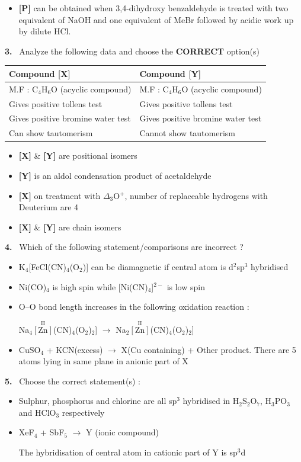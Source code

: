 \documentclass[10pt]{extarticle}
\newcommand{\qn}[1]{\par\smallskip\noindent\textbf{#1.}~}
\newenvironment{qoptions}{\begin{itemize}[leftmargin=1.8em,itemsep=1pt,topsep=2pt,label={}]}{\end{itemize}}
\newcommand{\opt}[2]{\item[(#1)] #2}
\begin{document}
\begin{multicols}{2}
\begin{qoptions}
\opt{D}{\textbf{[P]} can be obtained when 3,4-dihydroxy benzaldehyde is treated with two equivalent of NaOH and one equivalent of MeBr followed by acidic work up by dilute HCl.}
\end{qoptions}
\qn{3} Analyze the following data and choose the \textbf{CORRECT} option(s)\par
{\footnotesize\setlength{\tabcolsep}{2pt}\noindent\begin{tabular}{|L{3.9cm}|L{3.9cm}|}\hline
\centering\textbf{Compound [X]} & \centering\textbf{Compound [Y]}\tabularnewline\hline
M.F : C$_4$H$_6$O (acyclic compound) & M.F : C$_4$H$_6$O (acyclic compound)\\\hline
Gives positive tollens test & Gives positive tollens test\\\hline
Gives positive bromine water test & Gives positive bromine water test\\\hline
Can show tautomerism & Cannot show tautomerism\\\hline
\end{tabular}}\par
\begin{qoptions}
\opt{A}{\textbf{[X]} \& \textbf{[Y]} are positional isomers}
\opt{B}{\textbf{[Y]} is an aldol condensation product of acetaldehyde}
\opt{C}{\textbf{[X]} on treatment with $\Delta_3$O$^+$, number of replaceable hydrogens with Deuterium are 4}
\opt{D}{\textbf{[X]} \& \textbf{[Y]} are chain isomers}
\end{qoptions}
\qn{4} Which of the following statement/comparisons are incorrect ?
\begin{qoptions}
\opt{A}{K$_4$[FeCl(CN)$_4$(O$_2$)] can be diamagnetic if central atom is d$^2$sp$^3$ hybridised}
\opt{B}{Ni(CO)$_4$ is high spin while [Ni(CN)$_4$]$^{2-}$ is low spin}
\opt{C}{O--O bond length increases in the following oxidation reaction :\par Na$_4\overset{\text{II}}{[\text{Zn}]}$(CN)$_4$(O$_2$)$_2$] $\longrightarrow$ Na$_2\overset{\text{II}}{[\text{Zn}]}$(CN)$_4$(O$_2$)$_2$]}
\opt{D}{CuSO$_4$ + KCN(excess) $\longrightarrow$ X(Cu containing) + Other product. There are 5 atoms lying in same plane in anionic part of X}
\end{qoptions}
\qn{5} Choose the correct statement(s) :
\begin{qoptions}
\opt{A}{Sulphur, phosphorus and chlorine are all sp$^3$ hybridised in H$_2$S$_2$O$_7$, H$_3$PO$_3$ and HClO$_3$ respectively}
\opt{B}{XeF$_4$ + SbF$_5$ $\longrightarrow$ Y (ionic compound)\par The hybridisation of central atom in cationic part of Y is sp$^3$d}

\end{qoptions}
\end{multicols}
\end{document}
